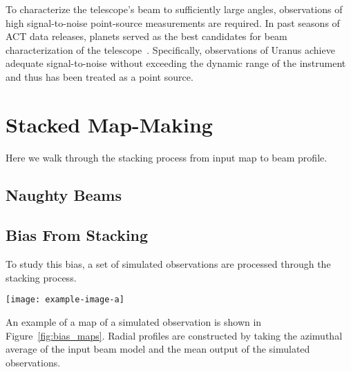 To characterize the telescope's beam to sufficiently large angles, observations of high signal-to-noise point-source measurements are required.  In past seasons of ACT data releases, planets served as the best candidates for beam characterization of the telescope~\cite{2021arXiv211212226L}.  Specifically, observations of Uranus achieve adequate signal-to-noise without exceeding the dynamic range of the instrument and thus has been treated as a point source.

\section{Stacked Map-Making}
\label{sec:maps}
Here we walk through the stacking process from input map to beam profile.

\subsection{Naughty Beams}
\label{subsec:filt}

\subsection{Bias From Stacking}
\label{subsec:tf}

To study this bias, a set of simulated observations are processed through the stacking process. 
\begin{figure*}
    \centering
    \texttt{[image: example-image-a]}
    \caption{Example of a simulated map used to characterize the mapping bias. 
    }
    \label{fig:bias_maps}
    \vspace{1em}
\end{figure*}
An example of a map of a simulated observation is shown in Figure~\ref{fig:bias_maps}. Radial profiles are constructed by taking the azimuthal average of the input beam model and the mean output of the simulated observations. 


